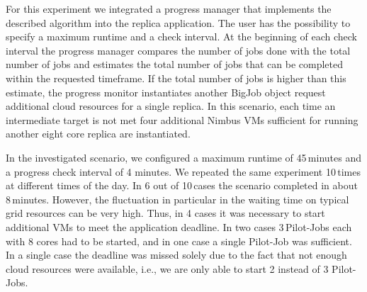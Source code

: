 \documentclass[3p,twocolumn]{elsarticle}
\begin{document}
For this experiment we integrated a progress manager that implements
the described algorithm into the replica application.  The user has
the possibility to specify a maximum runtime and a check interval.  At
the beginning of each check interval the progress manager compares the
number of jobs done with the total number of jobs and estimates the
total number of jobs that can be completed within the requested
timeframe. If the total number of jobs is higher than this estimate,
the progress monitor instantiates another BigJob object request
additional cloud resources for a single replica.  In this scenario,
each time an intermediate target is not met four additional Nimbus VMs
sufficient for running another eight core replica are instantiated.



In the investigated scenario, we configured a maximum runtime of
45\,minutes and a progress check interval of 4 minutes. We repeated
the same experiment 10\,times at different times of the day. In 6 out
of 10\,cases the scenario completed in about 8\,minutes. However, the
fluctuation in particular in the waiting time on typical grid
resources can be very high. Thus, in 4 cases it was necessary to start
additional VMs to meet the application deadline.  In two cases
3\,Pilot-Jobs each with 8 cores had to be started, and in one case a
single Pilot-Job was sufficient.  In a single case the deadline was
missed solely due to the fact that not enough cloud resources were
available, i.e., we are only able to start 2 instead of 3
Pilot-Jobs.
\end{document}
